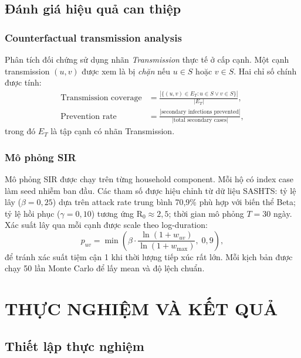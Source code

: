 \documentclass[12pt,a4paper]{report}
\theoremstyle{definition}
\begin{document}
\section{Đánh giá hiệu quả can thiệp}

\subsection{Counterfactual transmission analysis}

Phân tích đối chứng sử dụng nhãn \textit{Transmission} thực tế ở cấp cạnh. Một cạnh transmission $(u,v)$ được xem là bị \textit{chặn} nếu $u \in S$ hoặc $v \in S$. Hai chỉ số chính được tính:
\begin{align}
  \text{Transmission coverage} &= \frac{|\{(u,v) \in E_T : u \in S \lor v \in S\}|}{|E_T|}, \label{eq:trans_coverage}\\
  \text{Prevention rate} &= \frac{|\text{secondary infections prevented}|}{|\text{total secondary cases}|}, \label{eq:prevention_rate}
\end{align}
trong đó $E_T$ là tập cạnh có nhãn Transmission.

\subsection{Mô phỏng SIR}

Mô phỏng SIR được chạy trên từng household component. Mỗi hộ có index case làm seed nhiễm ban đầu. Các tham số được hiệu chỉnh từ dữ liệu SASHTS: tỷ lệ lây ($\beta = 0{,}25$) dựa trên attack rate trung bình 70,9\% phù hợp với biến thể Beta; tỷ lệ hồi phục ($\gamma = 0{,}10$) tương ứng R$_0 \approx 2{,}5$; thời gian mô phỏng $T = 30$ ngày. Xác suất lây qua mỗi cạnh được scale theo log-duration:
\begin{equation}
  p_{uv} = \min\!\left(\beta \cdot \frac{\ln(1 + w_{uv})}{\ln(1 + w_{\max})},\; 0{,}9\right),
  \label{eq:sir_prob}
\end{equation}
để tránh xác suất tiệm cận 1 khi thời lượng tiếp xúc rất lớn. Mỗi kịch bản được chạy 50 lần Monte Carlo để lấy mean và độ lệch chuẩn.

\chapter{THỰC NGHIỆM VÀ KẾT QUẢ}

\section{Thiết lập thực nghiệm}
\end{document}
